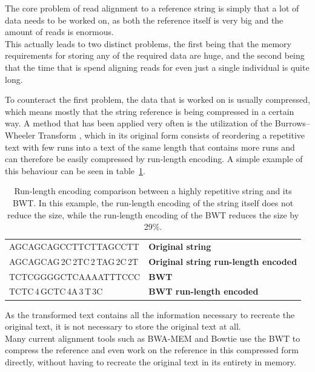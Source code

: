 \documentclass[a4paper,12pt,twoside,BCOR=10mm]{scrbook}
\begin{document}
The core problem of read alignment to a reference string is simply that a 
lot of data needs to be worked on, as both the reference itself is very big 
and the amount of reads is enormous. \\
This actually leads to two distinct problems, the first being that the 
memory requirements for storing any of the required data are huge, 
and the second being that the time that is spend aligning reads for 
even just a single individual is quite long.

To counteract the first problem, the data that is worked on is usually compressed, 
which means mostly that the string reference is being compressed in a certain way. 
A method that has been applied very often is the utilization of the 
Burrows--Wheeler Transform \citep{Burrows1994}, which 
in its original form consists of reordering a 
repetitive text with few runs into a text of the same length that contains more runs 
and can therefore be easily compressed by run-length encoding. 
A simple example of this behaviour can be seen in table~\ref{table:evo_background_bwt_run_enc}. 
\begin{table}[htb]
\centering
\caption[Run-length encoding comparison between a repetitive string and its BWT]{Run-length encoding comparison between a highly repetitive string and its BWT. In this example, the run-length encoding of the string itself does not reduce the size, while the run-length encoding of the BWT reduces the size by 29\%.}
   \begin{tabularx}{\textwidth}{ | X | X | }
   \hline
   AGCAGCAGCCTTCTTAGCCTT & \textbf{Original string} \\
   AGCAGCAG\,2C\,2TC\,2\,TAG\,2C\,2T & \textbf{Original string run-length encoded} \\
   \hline
   TCTCGGGGCTCAAAATTTCCC & \textbf{BWT} \\
   TCTC\,4\,GCTC\,4A\,3\,T\,3C & \textbf{BWT run-length encoded} \\
   \hline
   \end{tabularx}
\label{table:evo_background_bwt_run_enc}
\end{table}
As the transformed text contains all the information necessary to recreate the 
original text, it is not necessary to store the original text at all. \\
Many current alignment tools such as BWA-MEM \citep{Li2013} and Bowtie \citep{Langmead2009} use 
the BWT to compress the reference 
and even work on the reference in this compressed form directly, without having 
to recreate the original text in its entirety in memory.
\end{document}
